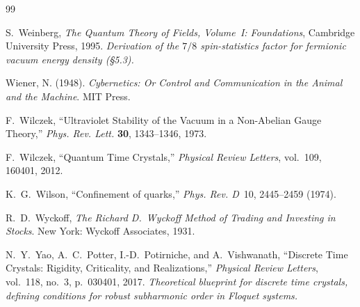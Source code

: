 \documentclass[12pt,oneside]{book}
\theoremstyle{principia}
\theoremstyle{definition}
\theoremstyle{remark}
\begin{document}
\begin{thebibliography}{99}

S.~Weinberg,
\emph{The Quantum Theory of Fields, Volume~I: Foundations},
Cambridge University Press, 1995.
\textit{Derivation of the $7/8$ spin-statistics factor for fermionic vacuum energy density (\S5.3).}


Wiener, N. (1948). \emph{Cybernetics: Or Control and Communication in the Animal and the Machine}. MIT Press.

F.~Wilczek, ``Ultraviolet Stability of the Vacuum in a Non-Abelian Gauge Theory,'' \emph{Phys. Rev. Lett.} \textbf{30}, 1343--1346, 1973.

F.~Wilczek,
``Quantum Time Crystals,''
\emph{Physical Review Letters}, vol.~109, 160401, 2012.

K.~G.~Wilson,
``Confinement of quarks,''
\emph{Phys. Rev. D}\ 10, 2445--2459 (1974).



R.~D.~Wyckoff,
\emph{The Richard D.~Wyckoff Method of Trading and Investing in Stocks}.
New York: Wyckoff Associates, 1931.

N.~Y.~Yao, A.~C.~Potter, I.-D.~Potirniche, and A.~Vishwanath,
``Discrete Time Crystals: Rigidity, Criticality, and Realizations,''
\emph{Physical Review Letters}, vol.~118, no.~3, p.~030401, 2017.
\textit{Theoretical blueprint for discrete time crystals, defining conditions
for robust subharmonic order in Floquet systems.}


\end{thebibliography}
\end{document}
